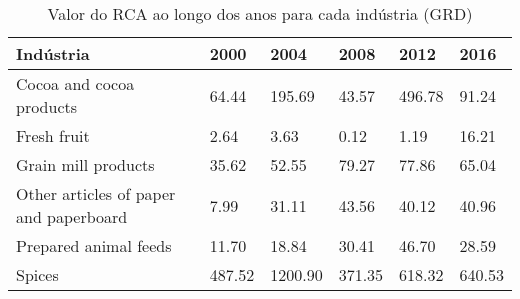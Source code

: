 \begin{table}
\centering
\caption{Valor do RCA ao longo dos anos para cada indústria (GRD)}
\label{tab:ex3-tempo-GRD}
\begin{tabular}{p{6cm}p{1.5cm}p{1.5cm}p{1.5cm}p{1.5cm}p{1.5cm}}
\toprule
                             Indústria &   2000 &    2004 &   2008 &   2012 &   2016 \\
\midrule
              Cocoa and cocoa products &  64.44 &  195.69 &  43.57 & 496.78 &  91.24 \\
                           Fresh fruit &   2.64 &    3.63 &   0.12 &   1.19 &  16.21 \\
                   Grain mill products &  35.62 &   52.55 &  79.27 &  77.86 &  65.04 \\
Other articles of paper and paperboard &   7.99 &   31.11 &  43.56 &  40.12 &  40.96 \\
                 Prepared animal feeds &  11.70 &   18.84 &  30.41 &  46.70 &  28.59 \\
                                Spices & 487.52 & 1200.90 & 371.35 & 618.32 & 640.53 \\
\bottomrule
\end{tabular}
\end{table}
